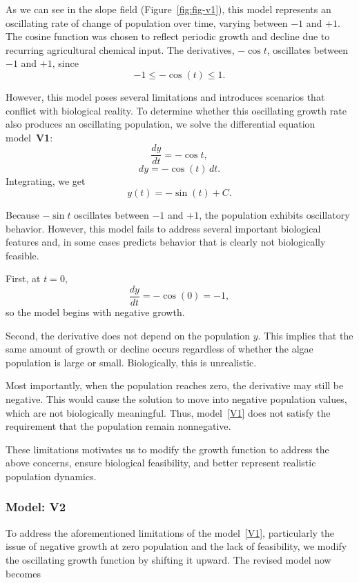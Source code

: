 \documentclass[11pt]{article}
\begin{document}
As we can see in the slope field (Figure~\ref{fig:fig-v1}), this model represents an oscillating rate of change of population over time, varying between $-1$ and $+1$. The cosine function was chosen to reflect periodic growth and decline due to recurring agricultural chemical input. The derivatives, $-\cos{t}$, oscillates between $-1$ and $+1$, since
\[
    -1 \leq -\cos(t) \leq 1.
\]

However, this model poses several limitations and introduces scenarios that conflict with biological reality. To determine whether this oscillating growth rate also produces an oscillating population, we solve the differential equation model~\textbf{V1}:
\[
    \frac{dy}{dt} = -\cos t,
\]
\[
dy = -\cos(t) \, dt.
\]
Integrating, we get
\[
y(t) = -\sin(t) + C.
\]

Because $-\sin{t}$ oscillates between $-1$ and $+1$, the population exhibits oscillatory behavior. However, this model fails to address several important biological features and, in some cases predicts behavior that is clearly not biologically feasible.

First, at $t = 0$,
\[
    \frac{dy}{dt} = -\cos(0) = -1,
\]
so the model begins with negative growth. 

Second, the derivative does not depend on the population $y$. This implies that the same amount of growth or decline occurs regardless of whether the algae population is large or small. Biologically, this is unrealistic.

Most importantly, when the population reaches zero, the derivative may still be negative. This would cause the solution to move into negative population values, which are not biologically meaningful. Thus, model~\ref{V1} does not satisfy the requirement that the population remain nonnegative.

These limitations motivates us to modify the growth function to address the above concerns, ensure biological feasibility, and better represent realistic population dynamics.

\subsubsection{Model: V2}

To address the aforementioned limitations of the model~\ref{V1}, particularly the issue of negative growth at zero population and the lack of feasibility, we modify the oscillating growth function by shifting it upward. The revised model now becomes
\end{document}
